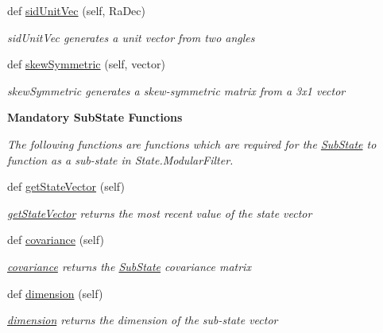 \begin{DoxyCompactItemize}
def \hyperlink{classmodest_1_1substates_1_1Attitude_1_1Attitude_ae1cb92ddb2b08fdf1f36a39678865b13}{sid\+Unit\+Vec} (self, Ra\+Dec)
\begin{DoxyCompactList}\small\item\em sid\+Unit\+Vec generates a unit vector from two angles \end{DoxyCompactList}\item 
def \hyperlink{classmodest_1_1substates_1_1Attitude_1_1Attitude_a3101bf3d381f06c791e0cfc29773b60e}{skew\+Symmetric} (self, vector)
\begin{DoxyCompactList}\small\item\em skew\+Symmetric generates a skew-\/symmetric matrix from a 3x1 vector \end{DoxyCompactList}\end{DoxyCompactItemize}
\begin{Indent}{\bf Mandatory Sub\+State Functions}\par
{\em The following functions are functions which are required for the \hyperlink{namespacemodest_1_1substates_1_1SubState}{Sub\+State} to function as a sub-\/state in State.\+Modular\+Filter. }\begin{DoxyCompactItemize}
\item 
def \hyperlink{classmodest_1_1substates_1_1SubState_1_1SubState_a26146efb15c1d33fee433df4725bae45}{get\+State\+Vector} (self)
\begin{DoxyCompactList}\small\item\em \hyperlink{classmodest_1_1substates_1_1SubState_1_1SubState_a26146efb15c1d33fee433df4725bae45}{get\+State\+Vector} returns the most recent value of the state vector \end{DoxyCompactList}\item 
def \hyperlink{classmodest_1_1substates_1_1SubState_1_1SubState_af77dd1cc9f3c6cc9e5619a2f56ca0cdd}{covariance} (self)
\begin{DoxyCompactList}\small\item\em \hyperlink{classmodest_1_1substates_1_1SubState_1_1SubState_af77dd1cc9f3c6cc9e5619a2f56ca0cdd}{covariance} returns the \hyperlink{classmodest_1_1substates_1_1SubState_1_1SubState}{Sub\+State} covariance matrix \end{DoxyCompactList}\item 
def \hyperlink{classmodest_1_1substates_1_1SubState_1_1SubState_aaf7473d2ebcd61adf1b7bb2262eb31d1}{dimension} (self)
\begin{DoxyCompactList}\small\item\em \hyperlink{classmodest_1_1substates_1_1SubState_1_1SubState_aaf7473d2ebcd61adf1b7bb2262eb31d1}{dimension} returns the dimension of the sub-\/state vector \end{DoxyCompactList}\end{DoxyCompactItemize}
\end{Indent}
